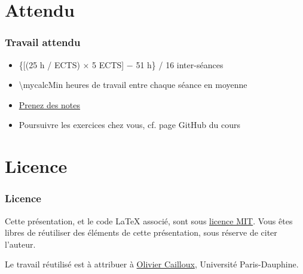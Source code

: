 \documentclass[english, french]{beamer}
\begin{document}
\section{Attendu}
\begin{frame}
	\frametitle{Travail attendu}
	\begin{itemize}
		\item \{[(25 h / ECTS) × 5 ECTS] − 51 h\} / 16 inter-séances
		\item \num[round-mode=places, round-precision=0, mode=text]{\mycalcMin} heures de travail entre chaque séance en moyenne
		\item \href{https://github.com/oliviercailloux/Teaching/blob/main/README.adoc\#take-notes}{Prenez des notes}
		\item Poursuivre les exercices chez vous, cf. page GitHub du cours
	\end{itemize}
\end{frame}

\appendix
\section{Licence}
\begin{frame}
	\frametitle{Licence}
	Cette présentation, et le code LaTeX associé, sont sous \href{https://opensource.org/licenses/MIT}{licence MIT}. Vous êtes libres de réutiliser des éléments de cette présentation, sous réserve de citer l’auteur.
	
	Le travail réutilisé est à attribuer à \href{https://www.lamsade.dauphine.fr/~ocailloux/}{Olivier Cailloux}, Université Paris-Dauphine.
\end{frame}
\end{document}
